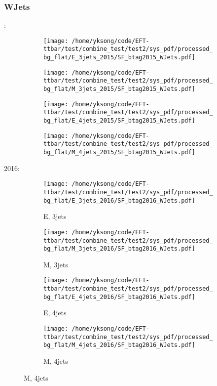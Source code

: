 \documentclass{beamer}
\begin{document}
\begin{frame}
\frametitle{WJets}
\fontsize{5}{1}:
\begin{figure}
\centering
\begin{subfigure}[b]{0.24\textwidth}
\texttt{[image: /home/yksong/code/EFT-ttbar/test/combine\_test/test2/sys\_pdf/processed\_bg\_flat/E\_3jets\_2015/SF\_btag2015\_WJets.pdf]}
\end{subfigure}
\begin{subfigure}[b]{0.24\textwidth}
\texttt{[image: /home/yksong/code/EFT-ttbar/test/combine\_test/test2/sys\_pdf/processed\_bg\_flat/M\_3jets\_2015/SF\_btag2015\_WJets.pdf]}
\end{subfigure}
\begin{subfigure}[b]{0.24\textwidth}
\texttt{[image: /home/yksong/code/EFT-ttbar/test/combine\_test/test2/sys\_pdf/processed\_bg\_flat/E\_4jets\_2015/SF\_btag2015\_WJets.pdf]}
\end{subfigure}
\begin{subfigure}[b]{0.24\textwidth}
\texttt{[image: /home/yksong/code/EFT-ttbar/test/combine\_test/test2/sys\_pdf/processed\_bg\_flat/M\_4jets\_2015/SF\_btag2015\_WJets.pdf]}
\end{subfigure}
\end{figure}
2016:
\begin{figure}
\centering
\begin{subfigure}[b]{0.24\textwidth}
\texttt{[image: /home/yksong/code/EFT-ttbar/test/combine\_test/test2/sys\_pdf/processed\_bg\_flat/E\_3jets\_2016/SF\_btag2016\_WJets.pdf]}
\captionsetup{font=tiny}
\caption{E, 3jets}
\end{subfigure}
\begin{subfigure}[b]{0.24\textwidth}
\texttt{[image: /home/yksong/code/EFT-ttbar/test/combine\_test/test2/sys\_pdf/processed\_bg\_flat/M\_3jets\_2016/SF\_btag2016\_WJets.pdf]}
\captionsetup{font=tiny}
\caption{M, 3jets}
\end{subfigure}
\begin{subfigure}[b]{0.24\textwidth}
\texttt{[image: /home/yksong/code/EFT-ttbar/test/combine\_test/test2/sys\_pdf/processed\_bg\_flat/E\_4jets\_2016/SF\_btag2016\_WJets.pdf]}
\captionsetup{font=tiny}
\caption{E, 4jets}
\end{subfigure}
\begin{subfigure}[b]{0.24\textwidth}
\texttt{[image: /home/yksong/code/EFT-ttbar/test/combine\_test/test2/sys\_pdf/processed\_bg\_flat/M\_4jets\_2016/SF\_btag2016\_WJets.pdf]}
\captionsetup{font=tiny}
\caption{M, 4jets}
\end{subfigure}
\end{figure}
\end{frame}
\end{document}
